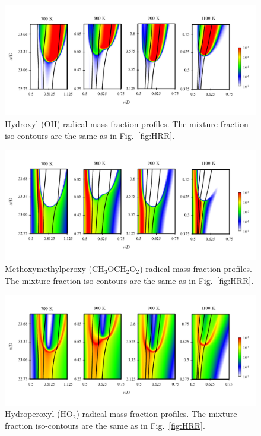 \documentclass[review,3p,times]{elsarticle}
\begin{document}
\begin{figure}[t]
  \centering
  \scriptsize
  \vspace{-0.1in}
  \includegraphics[width=1.0\textwidth]{OH.png}
  \normalsize
  \vspace{-0.1in}
  \caption{Hydroxyl (OH) radical mass fraction profiles.  The mixture fraction iso-contours are the same as in Fig.~\ref{fig:HRR}.}
  \label{fig:OH}
\end{figure}

\begin{figure}[t]
  \centering
  \scriptsize
  \vspace{-0.1in}
  \includegraphics[width=1.0\textwidth]{RO2.png}
  \normalsize
  \vspace{-0.1in}
  \caption{Methoxymethylperoxy (CH$_3$OCH$_2$O$_2$) radical mass fraction profiles.  The mixture fraction iso-contours are the same as in Fig.~\ref{fig:HRR}.}
  \label{fig:RO2}
\end{figure}

\begin{figure}[t]
  \centering
  \scriptsize
  \vspace{-0.1in}
  \includegraphics[width=1.0\textwidth]{HO2.png}
  \normalsize
  \vspace{-0.1in}
  \caption{Hydroperoxyl (HO$_2$) radical mass fraction profiles.  The mixture fraction iso-contours are the same as in Fig.~\ref{fig:HRR}.}
  \label{fig:HO2}
\end{figure}
\end{document}
